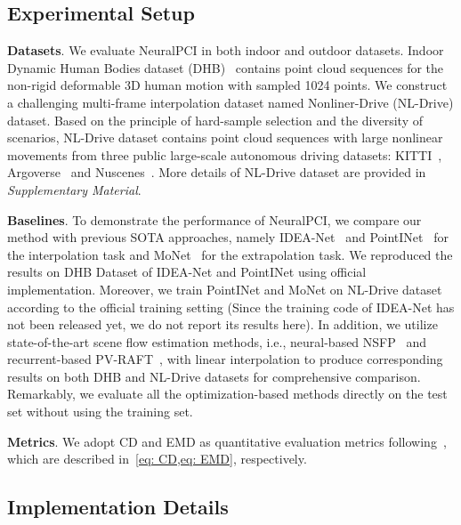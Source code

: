 \documentclass[10pt,twocolumn,letterpaper]{article}
\begin{document}
\subsection{Experimental Setup}
\label{sec: Experimental Setup}
\textbf{Datasets}. We evaluate NeuralPCI in both indoor and outdoor datasets. Indoor Dynamic Human Bodies dataset (DHB)~\cite{zeng2022idea} contains point cloud sequences for the non-rigid deformable 3D human motion with sampled 1024 points. We construct a challenging multi-frame interpolation dataset named Nonliner-Drive (NL-Drive) dataset. Based on the principle of hard-sample selection and the diversity of scenarios, NL-Drive dataset contains point cloud sequences with large nonlinear movements from three public large-scale autonomous driving datasets: KITTI~\cite{geiger2012we}, Argoverse~\cite{chang2019argoverse} and Nuscenes~\cite{caesar2020nuscenes}. More details of NL-Drive dataset are provided in \textit{Supplementary Material}.




\textbf{Baselines}. To demonstrate the performance of NeuralPCI, we compare our method with previous SOTA approaches, namely IDEA-Net~\cite{zeng2022idea} and PointINet~\cite{lu2021pointinet} for the interpolation task and MoNet~\cite{lu2021monet} for the extrapolation task. We reproduced the results on DHB Dataset of IDEA-Net and PointINet using official implementation. Moreover, we train PointINet and MoNet on NL-Drive dataset according to the official training setting (Since the training code of IDEA-Net has not been released yet, we do not report its results here). In addition, we utilize state-of-the-art scene flow estimation methods, i.e., neural-based NSFP~\cite{li2021neuralSF} and recurrent-based PV-RAFT~\cite{wei2021pv}, with linear interpolation to produce corresponding results on both DHB and NL-Drive datasets for comprehensive comparison. Remarkably, we evaluate all the optimization-based methods directly on the test set without using the training set.




\textbf{Metrics}. We adopt CD and EMD as quantitative evaluation metrics following~\cite{zeng2022idea,lu2021pointinet,lu2021monet}, which are described in~\cref{eq: CD,eq: EMD}, respectively. 




\subsection{Implementation Details}
\end{document}
